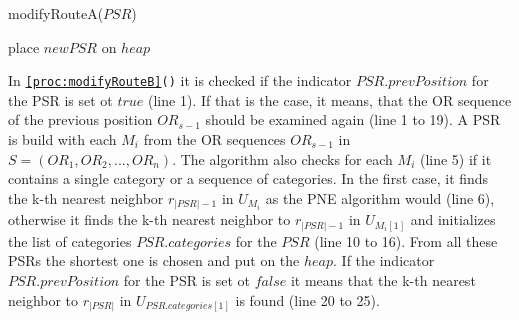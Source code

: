 \begin{procedure}[H]
\caption{modifyRouteA($PSR$)}
\label{proc:modifyRouteA}
	
		
	place $newPSR$ on $heap$\;
\end{procedure}

\pagebreak

In \texttt{\ref{proc:modifyRouteB}()} it is checked if the indicator $PSR.prevPosition$ for the PSR is set ot $true$ (line 1). If that is the case, it means, that the OR sequence of the previous position $OR_{s-1}$ should be examined again (line 1 to 19). A PSR is build with each $M_i$ from the OR sequences $OR_{s-1}$ in $S = (OR_1, OR_2, ..., OR_n)$. The algorithm also checks for each $M_i$ (line 5) if it contains a single category or a sequence of categories. In the first case, it finds the k-th nearest neighbor $r_{|PSR|-1}$ in $U_{M_{i}}$ as the PNE algorithm would (line 6), otherwise it finds the k-th nearest neighbor to $r_{|PSR|-1}$ in $U_{M_i[1]}$ and initializes the list of categories $PSR.categories$ for the $PSR$ (line 10 to 16). From all these PSRs the shortest one is chosen and put on the $heap$. 
If the indicator $PSR.prevPosition$ for the PSR is set ot $false$  it means that the k-th nearest neighbor to $r_{|PSR|}$ in $U_{PSR.categories[1]}$ is found (line 20 to 25).

